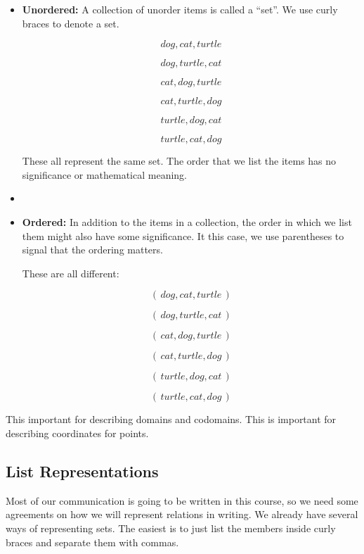 \documentclass{ximera}
\begin{document}
\begin{itemize}
\item \textbf{\textcolor{blue!55!black}{Unordered:}}  A collection of unorder items is called a ``set''.  We use curly braces to denote a set.

\[
{ \, dog, cat, turtle \, }
\]

\[
{ \, dog, turtle, cat \, }
\]

\[
{ \, cat, dog, turtle \, }
\]

\[
{ \, cat, turtle, dog \, }
\]

\[
{ \, turtle, dog, cat \, }
\]

\[
{ \, turtle, cat, dog \, }
\]

These all represent the same set.  The order that we list the items has no significance or mathematical meaning.


\item \item \textbf{\textcolor{blue!55!black}{Ordered:}} In addition to the items in a collection, the order in which we list them might also have some significance.  It this case, we use parentheses to signal that the ordering matters.


These are all different:

\[
( \, dog, cat, turtle \, )
\]

\[
( \, dog, turtle, cat \, )
\]

\[
( \, cat, dog, turtle \, )
\]

\[
( \, cat, turtle, dog \, )
\]

\[
( \, turtle, dog, cat \, )
\]

\[
( \, turtle, cat, dog \, )
\]


\end{itemize}


This important for describing domains and codomains.  This is important for describing coordinates for points. \\













\subsection{List Representations}

Most of our communication is going to be written in this course, so we need some agreements on how we will represent relations in writing.  We already have several ways of representing sets.  The easiest is to just list the members inside curly braces and separate them with commas.
\end{document}
